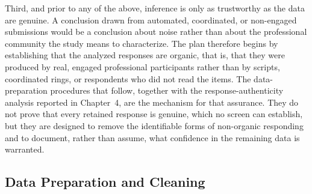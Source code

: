 Third, and prior to any of the above, inference is only as trustworthy as the data are genuine. A conclusion drawn from automated, coordinated, or non-engaged submissions would be a conclusion about noise rather than about the professional community the study means to characterize. The plan therefore begins by establishing that the analyzed responses are organic, that is, that they were produced by real, engaged professional participants rather than by scripts, coordinated rings, or respondents who did not read the items. The data-preparation procedures that follow, together with the response-authenticity analysis reported in Chapter~4, are the mechanism for that assurance. They do not prove that every retained response is genuine, which no screen can establish, but they are designed to remove the identifiable forms of non-organic responding and to document, rather than assume, what confidence in the remaining data is warranted.

\subsection{Data Preparation and Cleaning}


